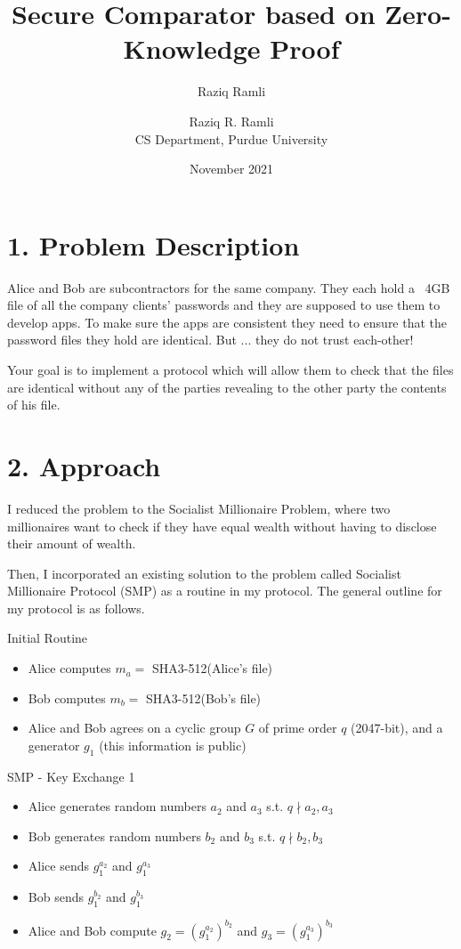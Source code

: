 \documentclass{article}
\title{Secure Comparator based on Zero-Knowledge Proof}
\author{Raziq Ramli}
\date{November 2021}
\author{Raziq R. Ramli\\ CS Department, Purdue University}
\begin{document}
\maketitle

\section*{1. Problem Description}

Alice and Bob are subcontractors for the same company. 
They each hold a ~4GB file of all the company clients’ 
passwords and they are supposed to use them to develop 
apps. To make sure the apps are consistent they need 
to ensure that the password files they hold are 
identical. But ... they do not trust each-other!

Your goal is to implement a protocol which will allow 
them to check that the files are identical without any 
of the parties revealing to the other party the contents 
of his file.

\section*{2. Approach}

I reduced the problem to the Socialist Millionaire Problem, where
two millionaires want to check if they have equal wealth without having to disclose
their amount of wealth. 

Then, I incorporated an existing solution to the problem called Socialist Millionaire
Protocol (SMP) as a routine in my protocol. The general outline for my protocol is as 
follows.


Initial Routine

\begin{itemize}
  \item Alice computes $m_a = $ SHA3-512(Alice's file)
  \item Bob computes $m_b = $ SHA3-512(Bob's file)
  \item Alice and Bob agrees on a cyclic group $G$ of prime order $q$ (2047-bit), 
    and a generator $g_1$
    (this information is public)
\end{itemize}

SMP - Key Exchange 1
\begin{itemize}
  \item Alice generates random numbers $a_2$ and $a_3$ s.t. $q \nmid a_2, a_3$
  \item Bob generates random numbers $b_2$ and $b_3$ s.t. $q \nmid b_2, b_3$
  \item Alice sends $g_1^{a_2}$ and $g_1^{a_3}$
  \item Bob sends $g_1^{b_2}$ and $g_1^{b_3}$
  \item Alice and Bob compute $g_2 = (g_1^{a_2})^{b_2}$ and $g_3 = (g_1^{a_3})^{b_3}$
\end{itemize}
\end{document}
